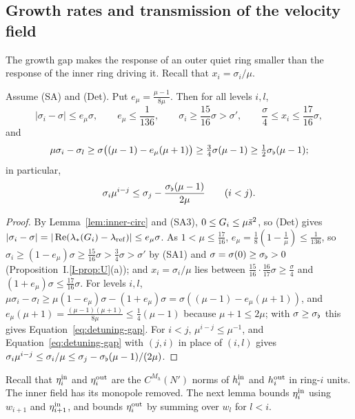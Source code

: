 \subsection{Growth rates and transmission of the velocity field}
\label{sec:relay-transmission}

The growth gap makes the response of an outer quiet ring smaller than the
response of the inner ring driving it. Recall that $x_i=\sigma_i/\mu$.

\begin{lemma}
\label{lem:detuning}
Assume (SA) and (Det). Put $e_\mu=\frac{\mu-1}{8\mu}$. Then for all levels $i,l$,
\begin{equation}
\label{eq:detuning-rates}
|\sigma_i-\sigma|\le e_\mu\sigma,\qquad e_\mu\le\frac1{136},\qquad
\sigma_i\ge\frac{15}{16}\sigma>\sigma',\qquad
\frac\sigma4\le x_i\le\frac{17}{16}\sigma,
\end{equation}
and
\begin{equation}
\label{eq:detuning-gap}
\mu\sigma_i-\sigma_l\ge\sigma\big((\mu-1)-e_\mu(\mu+1)\big)\ge\tfrac34\sigma(\mu-1)\ge\tfrac12\sigma_\flat(\mu-1);
\end{equation}
in particular,
\begin{equation}
\label{eq:detuning-ordered}
\sigma_i\mu^{i-j}\le\sigma_j-\frac{\sigma_\flat(\mu-1)}{2\mu}\qquad(i<j).
\end{equation}
\end{lemma}
\begin{proof}
By Lemma~\ref{lem:inner-circ} and (SA3), $0\le G_i\le \mu\bar s^2$, so (Det)
gives $|\sigma_i-\sigma|=|\Re(\lambda_*(G_i)-\lambda_{\mathrm{ref}})|\le e_\mu\sigma$. As
$1<\mu\le\frac{17}{16}$, $e_\mu=\frac18(1-\frac1\mu)\le\frac1{136}$, so
$\sigma_i\ge(1-e_\mu)\sigma\ge\frac{15}{16}\sigma>\frac34\sigma>\sigma'$ by
(SA1) and $\sigma=\sigma(0)\ge\sigma_\flat>0$ (Proposition~I.\ref{I-prop:U}(a)); and
$x_i=\sigma_i/\mu$ lies between $\frac{15}{16}\cdot\frac{16}{17}\sigma\ge\frac\sigma4$
and $(1+e_\mu)\sigma\le\frac{17}{16}\sigma$. For levels $i,l$,
$\mu\sigma_i-\sigma_l\ge\mu(1-e_\mu)\sigma-(1+e_\mu)\sigma=\sigma((\mu-1)-e_\mu(\mu+1))$,
and $e_\mu(\mu+1)=\frac{(\mu-1)(\mu+1)}{8\mu}\le\frac14(\mu-1)$ because
$\mu+1\le2\mu$; with $\sigma\ge\sigma_\flat$ this gives Equation~\eqref{eq:detuning-gap}. For $i<j$,
$\mu^{i-j}\le\mu^{-1}$, and Equation~\eqref{eq:detuning-gap} with $(j,i)$ in place of $(i,l)$ gives
$\sigma_i\mu^{i-j}\le\sigma_i/\mu\le\sigma_j-\sigma_\flat(\mu-1)/(2\mu)$.
\end{proof}

Recall that $\eta^{\mathrm{in}}_i$ and $\eta^{\mathrm{out}}_i$ are the $C^{M_h}(N')$ norms of
$h^{\mathrm{in}}_i$ and $h^{\mathrm{out}}_i$ in ring-$i$ units. The inner field has its monopole
removed. The next lemma bounds $\eta^{\mathrm{in}}_i$ using $w_{i+1}$ and $\eta^{\mathrm{in}}_{i+1}$,
and bounds $\eta^{\mathrm{out}}_i$ by summing over $w_l$ for $l<i$.

